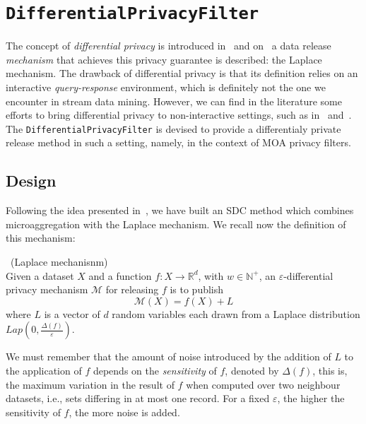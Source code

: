 \section{\texttt{DifferentialPrivacyFilter}}
\label{Implementation:DifferentialPrivacy}

The concept of \textit{differential privacy} is introduced in~ and on~ a data release \textit{mechanism} that achieves this privacy guarantee is described: the Laplace mechanism. The drawback of differential privacy is that its definition relies on an interactive \textit{query-response} environment, which is definitely not the one we encounter in stream data mining. However, we can find in the literature some efforts to bring differential privacy to non-interactive settings, such as in~\citet{Leoni:NonInteractiveDiffPriv} and~\citet{Domingo:EnhancingDiffPrivMicroaggregation}. The \texttt{DifferentialPrivacyFilter} is devised to provide a differentialy private release method in such a setting, namely, in the context of MOA privacy filters.

\subsection{Design}
\label{Implementation:DifferentialPrivacy:Design}

Following the idea presented in~\citet{Domingo:EnhancingDiffPrivMicroaggregation}, we have built an SDC method which combines microaggregation with the Laplace mechanism. We recall now the definition of this mechanism:

\begin{definition}~(Laplace mechanisnm)\\
Given a dataset $X$ and a function $f : X \rightarrow \mathbb{R}^d$, with $w \in \mathbb{N}^+$, an $\varepsilon$-differential privacy mechanism $\mathcal{M}$ for releasing $f$ is to publish
\begin{equation*}
\mathcal{M}(X) = f(X) + L
\end{equation*}
where $L$ is a vector of $d$ random variables each drawn from a Laplace distribution $Lap(0,\frac{\Delta(f)}{\varepsilon})$.
\end{definition}

We must remember that the amount of noise introduced by the addition of $L$ to the application of $f$ depends on the \textit{sensitivity} of $f$, denoted by $\Delta (f)$, this is, the maximum variation in the result of $f$ when computed over two neighbour datasets, i.e., sets differing in at most one record. For a fixed $\varepsilon$, the higher the sensitivity of $f$, the more noise is added.


